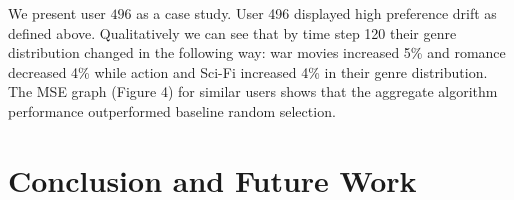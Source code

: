 \documentclass{article}
\begin{document}
We present user $496$ as a case study. User 496 displayed high preference drift as defined above. Qualitatively we can see that by time step 120 their genre distribution changed in the following way: war movies increased 5\% and romance decreased 4\% while action and Sci-Fi increased 4\% in their genre distribution. The MSE graph (Figure 4) for similar users shows that the aggregate algorithm performance outperformed baseline random selection.  

\section{Conclusion and Future Work}

\nocite{kawale2015efficient}
\nocite{wang2017online}
\nocite{zhao2013interactive}
\nocite{cherkassky2013sequential}
\nocite{arulampalam2002tutorial}
\nocite{douc2005comparison}
\nocite{doucet2009tutorial}
\nocite{orhan2012particle}
\nocite{lo2017temporal}
\nocite{lindsten2015rao}



\end{document}
